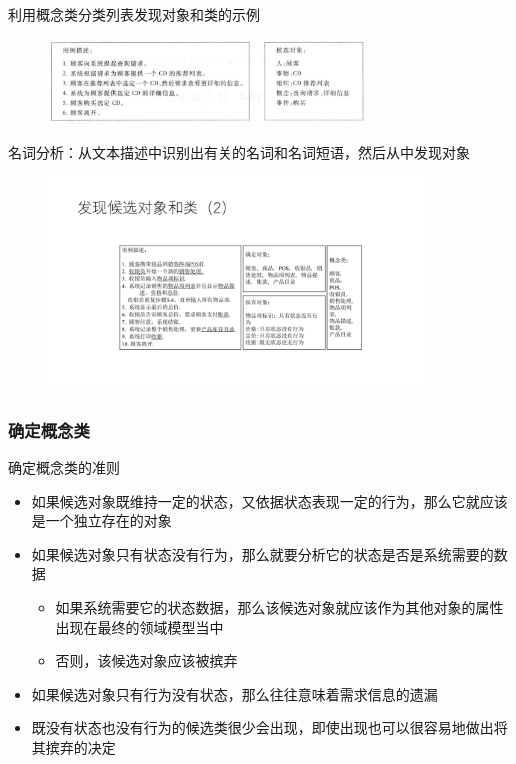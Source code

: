 利用概念类分类列表发现对象和类的示例
\begin{figure}[H]
	\centering
    \vspace{-0.5em}
	\includegraphics[width=0.75\textwidth]{img/利用概念类分类列表发现对象和类的示例.png}
    \vspace{-1em}
\end{figure}


名词分析：从文本描述中识别出有关的名词和名词短语，然后从中发现对象
\begin{figure}[H]
	\centering
    \vspace{-0.5em}
	\includegraphics[width=0.9\textwidth]{img/利用名词分析发现候选对象和类.pdf}
    \vspace{-1em}
\end{figure}

\subsubsection{确定概念类}
确定概念类的准则
\begin{itemize}
    \item 如果候选对象既维持一定的状态，又依据状态表现一定的行为，那么它就应该是一个独立存在的对象
    \item 如果候选对象只有状态没有行为，那么就要分析它的状态是否是系统需要的数据
    \begin{itemize}
        \item 如果系统需要它的状态数据，那么该候选对象就应该作为其他对象的属性出现在最终的领域模型当中
        \item 否则，该候选对象应该被摈弃
    \end{itemize}
    \item 如果候选对象只有行为没有状态，那么往往意味着需求信息的遗漏
    \item 既没有状态也没有行为的候选类很少会出现，即使出现也可以很容易地做出将其摈弃的决定
\end{itemize}

